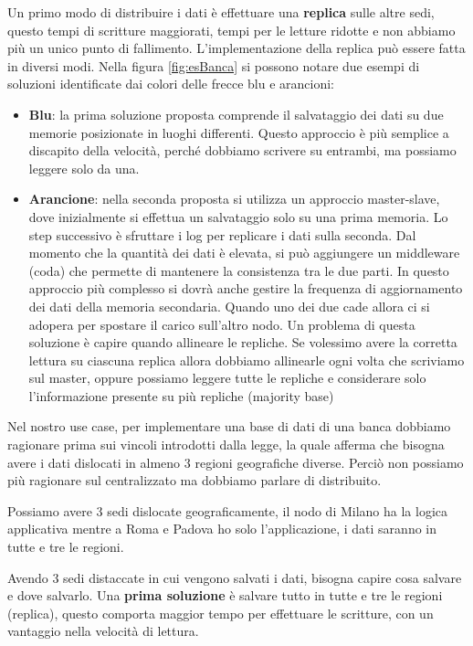 Un primo modo di distribuire i dati è effettuare una \textbf{replica} sulle altre
sedi, questo tempi di scritture maggiorati, tempi per le letture ridotte e
non abbiamo più un unico punto di fallimento. L'implementazione della replica può
essere fatta in diversi modi. Nella figura \ref{fig:esBanca} si possono notare due
esempi di soluzioni identificate dai colori delle frecce blu e arancioni:
\begin{itemize}
    \item \textbf{Blu}: la prima soluzione proposta comprende il salvataggio
          dei dati su due memorie posizionate in luoghi differenti. Questo approccio è più
          semplice a discapito della velocità, perché dobbiamo scrivere su entrambi,
          ma possiamo leggere solo da una.
    \item \textbf{Arancione}: nella seconda proposta si utilizza un approccio
          master-slave, dove inizialmente si effettua un salvataggio solo su una
          prima memoria. Lo step successivo è sfruttare i log per replicare i
          dati sulla seconda. Dal momento che la quantità dei dati è elevata,
          si può aggiungere un middleware (coda) che permette di mantenere la
          consistenza tra le due parti. In questo approccio più complesso si
          dovrà anche gestire la frequenza di aggiornamento dei dati della
          memoria secondaria. Quando uno dei due cade allora ci si adopera per
          spostare il carico sull'altro nodo. Un problema di questa soluzione è
          capire quando allineare le repliche. Se volessimo avere la corretta
          lettura su ciascuna replica allora dobbiamo allinearle ogni volta che
          scriviamo sul master, oppure possiamo leggere tutte le repliche e
          considerare solo l'informazione presente su più repliche (majority base)
\end{itemize}
Nel nostro use case, per implementare una base di dati di una banca dobbiamo ragionare
prima sui vincoli introdotti dalla legge, la quale afferma che bisogna avere i
dati dislocati in almeno $3$ regioni geografiche diverse. Perciò non possiamo più
ragionare sul centralizzato ma dobbiamo parlare di distribuito.

Possiamo avere $3$ sedi dislocate geograficamente, il nodo di Milano ha la logica
applicativa mentre a Roma e Padova ho solo l'applicazione, i dati saranno in tutte
e tre le regioni.

Avendo $3$ sedi distaccate in cui vengono salvati i dati, bisogna capire cosa salvare
e dove salvarlo.
Una \textbf{prima soluzione} è salvare tutto in tutte e tre le regioni (replica),
questo comporta maggior tempo per effettuare le scritture, con un vantaggio nella
velocità di lettura.

